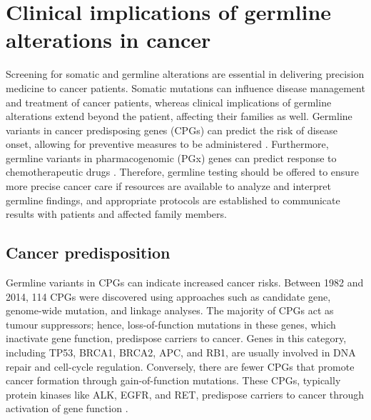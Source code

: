 

\section{Clinical implications of germline alterations in cancer}
\label{sec:Clinicalimplicationsofgermlinealterationsincancer}

Screening for somatic and germline alterations are essential in delivering precision medicine to cancer patients. Somatic mutations can influence disease management and treatment of cancer patients, whereas clinical implications of germline alterations extend beyond the patient, affecting their families as well. Germline variants in cancer predisposing genes (\acs{CPG}s) can predict the risk of disease onset, allowing for preventive measures to be administered \cite{Rahman2014}. Furthermore, germline variants in pharmacogenomic (\acs{PGx}) genes can predict response to chemotherapeutic drugs \cite{Panczyk2014, Mohelnikova-Duchonova2014}. Therefore, germline testing should be offered to ensure more precise cancer care if resources are available to analyze and interpret germline findings, and appropriate protocols are established to communicate results with patients and affected family members.

\subsection{Cancer predisposition}

Germline variants in CPGs can indicate increased cancer risks. Between 1982 and 2014, 114 CPGs were discovered using approaches such as candidate gene, genome-wide mutation, and linkage analyses. The majority of CPGs act as tumour suppressors; hence, loss-of-function mutations in these genes, which inactivate gene function, predispose carriers to cancer. Genes in this category, including \acs{TP53}, \acs{BRCA1}, \acs{BRCA2}, \acs{APC}, and \acs{RB1}, are usually involved in DNA repair and cell-cycle regulation. Conversely, there are fewer CPGs that promote cancer formation through gain-of-function mutations. These CPGs, typically protein kinases like \acs{ALK}, \acs{EGFR}, and \acs{RET}, predispose carriers to cancer through activation of gene function \cite{Rahman2014}.

